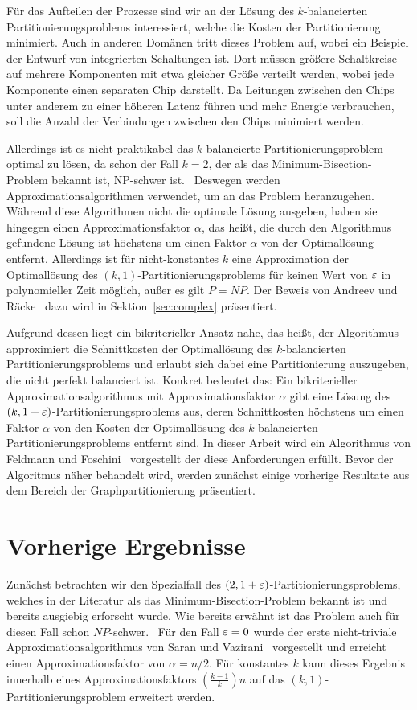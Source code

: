 Für das Aufteilen der Prozesse sind wir an der Lösung des $k$\hyp balancierten Partitionierungsproblems interessiert, welche die Kosten der Partitionierung minimiert.
Auch in anderen Domänen tritt dieses Problem auf, wobei ein Beispiel der Entwurf von integrierten Schaltungen ist.
Dort müssen größere Schaltkreise auf mehrere Komponenten mit etwa gleicher Größe verteilt werden, wobei jede Komponente einen separaten Chip darstellt.
Da Leitungen zwischen den Chips unter anderem zu einer höheren Latenz führen und mehr Energie verbrauchen, soll die Anzahl der Verbindungen zwischen den Chips minimiert werden.

Allerdings ist es nicht praktikabel das $k$\hyp balancierte Partitionierungsproblem optimal zu lösen, da schon der Fall $k=2$, der als das Minimum-Bisection-Problem bekannt ist, NP-schwer ist.~\cite{gj79}
Deswegen werden Approximationsalgorithmen verwendet, um an das Problem heranzugehen.
Während diese Algorithmen nicht die optimale Lösung ausgeben, haben sie hingegen einen Approximationsfaktor $\alpha$, das heißt, die durch den Algorithmus gefundene Lösung ist höchstens um einen Faktor $\alpha$ von der Optimallösung entfernt.
Allerdings ist für nicht-konstantes $k$ eine Approximation der Optimallösung des $(k, 1)$\hyp Partitionierungsproblems für keinen Wert von $\varepsilon$ in polynomieller Zeit möglich, außer es gilt $P=NP$.
Der Beweis von Andreev und Räcke~\cite{ar06} dazu wird in Sektion~\ref{sec:complex} präsentiert.

Aufgrund dessen liegt ein bikriterieller Ansatz nahe, das heißt, der Algorithmus approximiert die Schnittkosten der Optimallösung des $k$\hyp balancierten Partitionierungsproblems und erlaubt sich dabei eine Partitionierung auszugeben, die nicht perfekt balanciert ist.
Konkret bedeutet das: Ein bikriterieller Approximationsalgorithmus mit Approximationsfaktor $\alpha$ gibt eine Lösung des $(k, 1 + \varepsilon)$\hyp Partitionierungsproblems aus, deren Schnittkosten höchstens um einen Faktor $\alpha$ von den Kosten der Optimallösung des $k$\hyp balancierten Partitionierungsproblems entfernt sind.
In dieser Arbeit wird ein Algorithmus von Feldmann und Foschini~\cite{FF15} vorgestellt der diese Anforderungen erfüllt.
Bevor der Algoritmus näher behandelt wird, werden zunächst einige vorherige Resultate aus dem Bereich der Graphpartitionierung präsentiert.

\section{Vorherige Ergebnisse}
Zunächst betrachten wir den Spezialfall des $(2, 1 + \varepsilon)$\hyp Partitionierungsproblems, welches in der Literatur als das Minimum-Bisection-Problem bekannt ist und bereits ausgiebig erforscht wurde.
Wie bereits erwähnt ist das Problem auch für diesen Fall schon $NP$\hyp schwer.~\cite{gj79}
Für den Fall $\varepsilon = 0$ wurde der erste nicht-triviale Approximationsalgorithmus von Saran und Vazirani~\cite{SV91} vorgestellt und erreicht einen Approximationsfaktor von $\alpha = n/2$.
Für konstantes $k$ kann dieses Ergebnis innerhalb eines Approximationsfaktors $\left(\frac{k-1}{k}\right)n$ auf das $(k, 1)$\hyp Partitionierungsproblem erweitert werden.

